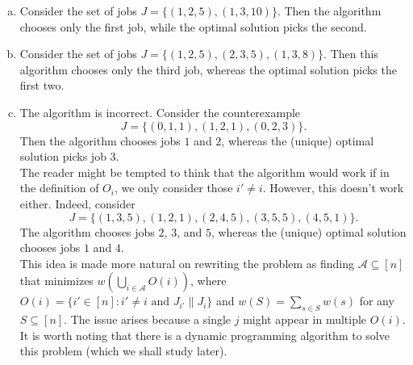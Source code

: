 \begin{solution*}
	\begin{enumerate}[(a)]
		\item Consider the set of jobs $J=\{(1,2,5),(1,3,10)\}$. Then the algorithm chooses only the first job, while the optimal solution picks the second.
		
		\item Consider the set of jobs $J=\{(1,2,5),(2,3,5),(1,3,8)\}$. Then this algorithm chooses only the third job, whereas the optimal solution picks the first two.
		
		\item The algorithm is incorrect. Consider the counterexample
		\[ J = \{(0,1,1),(1,2,1),(0,2,3)\}. \]
		Then the algorithm chooses jobs $1$ and $2$, whereas the (unique) optimal solution picks job $3$.\\
		The reader might be tempted to think that the algorithm would work if in the definition of $O_i$, we only consider those $i'\neq i$. However, this doesn't work either. Indeed, consider
		\[ J = \{(1,3,5),(1,2,1),(2,4,5),(3,5,5),(4,5,1)\}. \]
		The algorithm chooses jobs $2$, $3$, and $5$, whereas the (unique) optimal solution chooses jobs $1$ and $4$.\\
		This idea is made more natural on rewriting the problem as finding $\mathcal{A}\subseteq[n]$ that minimizes $w\left(\bigcup_{i\in\mathcal{A}} O(i)\right)$,	where $O(i) = \{i'\in[n] : i'\neq i\text{ and }J_{i'}\|J_i\}$ and $w(S)=\sum_{s\in S}w(s)$ for any $S\subseteq[n]$. The issue arises because a single $j$ might appear in multiple $O(i)$. It is worth noting that there is a dynamic programming algorithm to solve this problem (which we shall study later).
	\end{enumerate}
\end{solution*}


